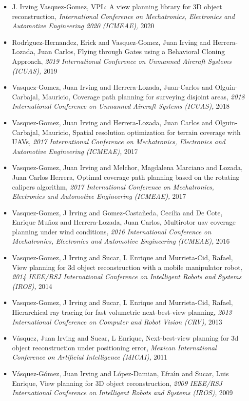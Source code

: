\begin{itemize} 
\item J. Irving Vasquez-Gomez, VPL: A view planning library for 3D object reconstruction, \textit{ International Conference on Mechatronics, Electronics and Automotive Engineering 2020 (ICMEAE),} 2020 
\item Rodr{\'\i}guez-Hernandez, Erick and Vasquez-Gomez, Juan Irving and Herrera-Lozada, Juan Carlos, Flying through Gates using a Behavioral Cloning Approach, \textit{ 2019 International Conference on Unmanned Aircraft Systems (ICUAS),} 2019 
\item Vasquez-Gomez, Juan Irving and Herrera-Lozada, Juan-Carlos and Olguin-Carbajal, Mauricio, Coverage path planning for surveying disjoint areas, \textit{ 2018 International Conference on Unmanned Aircraft Systems (ICUAS),} 2018 
\item Vasquez-Gomez, Juan Irving and Herrera-Lozada, Juan Carlos and Olguin-Carbajal, Mauricio, Spatial resolution optimization for terrain coverage with UAVs, \textit{ 2017 International Conference on Mechatronics, Electronics and Automotive Engineering (ICMEAE),} 2017 
\item Vasquez-Gomez, Juan Irving and Melchor, Magdalena Marciano and Lozada, Juan Carlos Herrera, Optimal coverage path planning based on the rotating calipers algorithm, \textit{ 2017 International Conference on Mechatronics, Electronics and Automotive Engineering (ICMEAE),} 2017 
\item Vasquez-Gomez, J Irving and Gomez-Casta{\~n}eda, Cecilia and De Cote, Enrique Mu{\~n}oz and Herrera-Lozada, Juan Carlos, Multirotor uav coverage planning under wind conditions, \textit{ 2016 International Conference on Mechatronics, Electronics and Automotive Engineering (ICMEAE),} 2016 
\item Vasquez-Gomez, J Irving and Sucar, L Enrique and Murrieta-Cid, Rafael, View planning for 3d object reconstruction with a mobile manipulator robot, \textit{ 2014 IEEE/RSJ International Conference on Intelligent Robots and Systems (IROS),} 2014 
\item Vasquez-Gomez, J Irving and Sucar, L Enrique and Murrieta-Cid, Rafael, Hierarchical ray tracing for fast volumetric next-best-view planning, \textit{ 2013 International Conference on Computer and Robot Vision (CRV),} 2013 
\item V{\'a}squez, Juan Irving and Sucar, L Enrique, Next-best-view planning for 3d object reconstruction under positioning error, \textit{ Mexican International Conference on Artificial Intelligence (MICAI),} 2011 
\item V{\'a}squez-G{\'o}mez, Juan Irving and L{\'o}pez-Damian, Efra{\'\i}n and Sucar, Luis Enrique, View planning for 3D object reconstruction, \textit{ 2009 IEEE/RSJ International Conference on Intelligent Robots and Systems (IROS),} 2009 
\end{itemize} 
